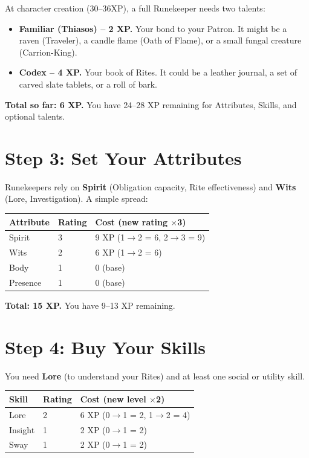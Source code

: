 At character creation (30--36XP), a full Runekeeper needs two talents:

\begin{itemize}
  \item \textbf{Familiar (Thiasos) -- 2 XP.} Your bond to your Patron. It might be a raven (Traveler), a candle flame (Oath of Flame), or a small fungal creature (Carrion-King).
  \item \textbf{Codex -- 4 XP.} Your book of Rites. It could be a leather journal, a set of carved slate tablets, or a roll of bark.
\end{itemize}

\textbf{Total so far: 6 XP.} You have 24--28 XP remaining for Attributes, Skills, and optional talents.

\section{Step 3: Set Your Attributes}

Runekeepers rely on \textbf{Spirit} (Obligation capacity, Rite effectiveness) and \textbf{Wits} (Lore, Investigation). A simple spread:

\begin{center}
\begin{tabular}{lll}
\toprule
\textbf{Attribute} & \textbf{Rating} & \textbf{Cost (new rating \(\times\)3)} \\
\midrule
Spirit & 3 & 9 XP (1$\to$2 = 6, 2$\to$3 = 9) \\
Wits & 2 & 6 XP (1$\to$2 = 6) \\
Body & 1 & 0 (base) \\
Presence & 1 & 0 (base) \\
\bottomrule
\end{tabular}
\end{center}

\textbf{Total: 15 XP.} You have 9--13 XP remaining.

\section{Step 4: Buy Your Skills}

You need \textbf{Lore} (to understand your Rites) and at least one social or utility skill.

\begin{center}
\begin{tabular}{lll}
\toprule
\textbf{Skill} & \textbf{Rating} & \textbf{Cost (new level \(\times\)2)} \\
\midrule
Lore & 2 & 6 XP (0$\to$1 = 2, 1$\to$2 = 4) \\
Insight & 1 & 2 XP (0$\to$1 = 2) \\
Sway & 1 & 2 XP (0$\to$1 = 2) \\
\bottomrule
\end{tabular}
\end{center}

